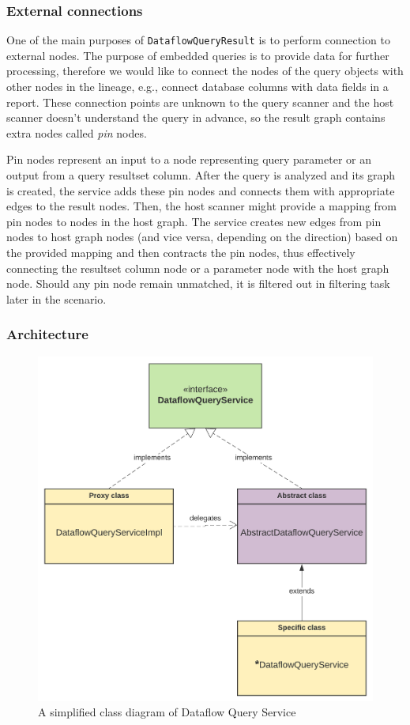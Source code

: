 \subsubsection{External connections}
One of the main purposes of \texttt{DataflowQueryResult} is to perform connection to external nodes. The purpose of embedded queries is to provide data for further processing, therefore we would like to connect the nodes of the query objects with other nodes in the lineage, e.g., connect database columns with data fields in a report. These connection points are unknown to the query scanner and the host scanner doesn't understand the query in advance, so the result graph contains extra nodes called \textit{pin} nodes.
\par
Pin nodes represent an input to a node representing query parameter or an output from a query resultset column. After the query is analyzed and its graph is created, the service adds these pin nodes and connects them with appropriate edges to the result nodes. Then, the host scanner might provide a mapping from pin nodes to nodes in the host graph. The service creates new edges from pin nodes to host graph nodes (and vice versa, depending on the direction) based on the provided mapping and then contracts the pin nodes, thus effectively connecting the resultset column node or a parameter node with the host graph node. Should any pin node remain unmatched, it is filtered out in filtering task later in the scenario.

\subsubsection{Architecture}
\begin{figure}[ht]\centering
\includegraphics[width=1.0\textwidth]{img/cls.png}
\caption{A simplified class diagram of Dataflow Query Service}
\label{fig01:QS}
\end{figure}  


